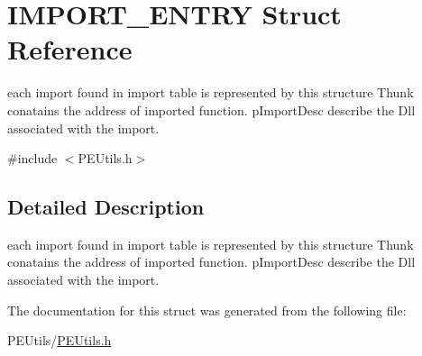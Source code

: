 \hypertarget{struct_i_m_p_o_r_t___e_n_t_r_y}{}\section{I\+M\+P\+O\+R\+T\+\_\+\+E\+N\+T\+RY Struct Reference}
\label{struct_i_m_p_o_r_t___e_n_t_r_y}


each import found in import table is represented by this structure Thunk conatains the address of imported function. p\+Import\+Desc describe the Dll associated with the import.  




{\ttfamily \#include $<$P\+E\+Utils.\+h$>$}



\subsection{Detailed Description}
each import found in import table is represented by this structure Thunk conatains the address of imported function. p\+Import\+Desc describe the Dll associated with the import. 

The documentation for this struct was generated from the following file\+:\begin{DoxyCompactItemize}
\item 
P\+E\+Utils/\mbox{\hyperlink{_p_e_utils_8h}{P\+E\+Utils.\+h}}\end{DoxyCompactItemize}
